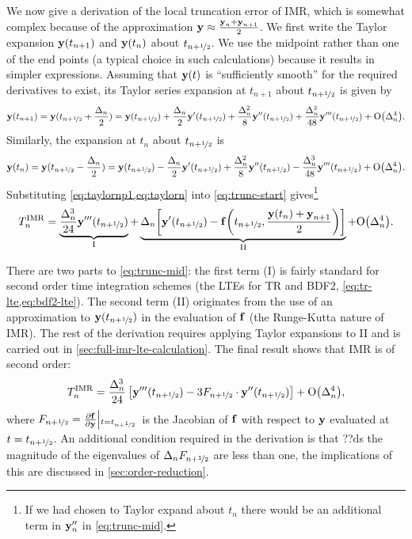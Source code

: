 We now give a derivation of the local truncation error of IMR, which is somewhat complex because of the approximation $\boldsymbol{\mathrm{y}} \approx \frac{\boldsymbol{\mathrm{y}}_n + \boldsymbol{\mathrm{y}}_{n+1}}{2}$.
We first write the Taylor expansion $\boldsymbol{\mathrm{y}}(t_{n+1})$ and $\boldsymbol{\mathrm{y}}(t_{n})$ about $t_{n+\nicefrac{1}{2}}$.
We use the midpoint rather than one of the end points (a typical choice in such calculations) because it results in simpler expressions.
Assuming that $\boldsymbol{\mathrm{y}}(t)$ is ``sufficiently smooth'' for the required derivatives to exist, its Taylor series expansion at $t_{n+1}$ about $t_{n+\nicefrac{1}{2}}$ is given by
\begin{equation}
  \yv(t_{n+1}) = \yv(\thf + \frac{\dtn}{2}) = \yvhf + \frac{\dtn}{2} \yvhf[']
  + \frac{\dtn^2}{8} \yvhf['']
  + \frac{\dtn^3}{48} \yvhf[''']
  + \order{\dtn^4}.
  \label{eq:taylornp1}
\end{equation}
Similarly, the expansion at $t_n$ about $t_{n+\nicefrac{1}{2}}$ is
\begin{equation}
  \yv(t_n) = \yv(\thf - \frac{\dtn}{2}) = \yvhf - \frac{\dtn}{2} \yvhf[']
  + \frac{\dtn^2}{8} \yvhf['']
  - \frac{\dtn^3}{48} \yvhf[''']
  + \order{\dtn^4}.
  \label{eq:taylorn}
\end{equation}
Substituting \cref{eq:taylornp1,eq:taylorn} into \cref{eq:trunc-start} gives\footnote{If we had chosen to Taylor expand about $t_n$ there would be an additional term in $\boldsymbol{\mathrm{y}}_n''$ in \cref{eq:trunc-mid}.}
\begin{equation}
  \lte^\imr = \underbrace{\frac{\dtn^3}{24} \yvhf[''']}_{\text{I}}
  + \underbrace{\dtn\bigs{ \yvhf['] - \ffv{\thf, \frac{\yv(t_n) + \yv_{n+1}}{2}} }}_{\text{II}}
  + \order{\dtn^4}.
  \label{eq:trunc-mid}
\end{equation}

There are two parts to \cref{eq:trunc-mid}: the first term (I) is fairly standard for second order time integration schemes (\cf the LTEs for TR and BDF2, \cref{eq:tr-lte,eq:bdf2-lte}).
The second term (II) originates from the use of an approximation to $\boldsymbol{\mathrm{y}}(t_{n+\nicefrac{1}{2}})$ in the evaluation of ${\boldsymbol{\mathrm{f}}}$ (\ie the Runge-Kutta nature of IMR).
The rest of the derivation requires applying Taylor expansions to II and is carried out in \cref{sec:full-imr-lte-calculation}.
The final result shows that IMR is of second order:
\begin{equation}
  \lte^\imr = \frac{\dtn^3}{24} \left[\yvhf['''] - 3 \dfdyhf \cdot \yvhf[''] \right]
  + \order{\dtn^4},
  \label{eq:trunc-final}
\end{equation}
where $F_{n+\nicefrac{1}{2}} = \frac{\partial {\boldsymbol{\mathrm{f}}}}{\partial \boldsymbol{\mathrm{y}}}{\left|_{t=t_{n+\nicefrac{1}{2}}}\right.}$ is the Jacobian of ${\boldsymbol{\mathrm{f}}}$ with respect to $\boldsymbol{\mathrm{y}}$ evaluated at $t=t_{n+\nicefrac{1}{2}}$.
An additional condition required in the derivation is that ??ds the magnitude of the eigenvalues of $\Delta_{n}F_{n+\nicefrac{1}{2}}$ are less than one, the implications of this are discussed in \cref{sec:order-reduction}.

